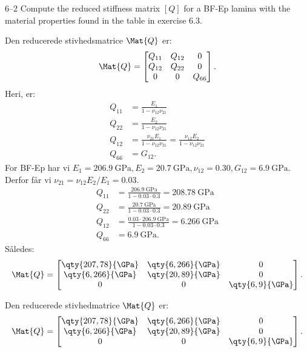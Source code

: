 \begin{problem}{6--2}
  Compute the reduced stiffness matrix $[Q]$ for a BF-Ep lamina with the material properties found in the table in exercise 6.3.
\end{problem}

\begin{derivation}
  Den reducerede stivhedsmatrice $\Mat{Q}$ er:
  \begin{equation*}
    \Mat{Q} = \begin{bmatrix}
      Q_{11} & Q_{12} & 0\\
    Q_{12} & Q_{22} & 0\\
    0 & 0 & Q_{66}\\
    \end{bmatrix}
  .\end{equation*}
  Heri, er:
  \begin{align*}
    Q_{11} &= \frac{E_1}{1 - \nu_{12}\nu_{21}} \\
    Q_{22} &= \frac{E_2}{1 - \nu_{12}\nu_{21}} \\
    Q_{12} &= \frac{\nu_{21} E_1}{ 1 - \nu_{12} \nu_{21}} = \frac{\nu_{12} E_2}{1  - \nu_{12} \nu_{21}} \\
    Q_{66} &= G_{12}
  .\end{align*}
  For BF-Ep har vi $E_1 = \qty{206,9}{\GPa}, E_2 = \qty{20,7}{\GPa}, \nu_{12} = \num{0,30}, G_{12} = \qty{6,9}{\GPa}$. Derfor får vi $\nu_{21} = \nu_{12} E_2 / E_1 = \num{0,03}$.
  \begin{align*}
    Q_{11} &= \frac{\qty{206,9}{\GPa}}{1 - \num{0,03} \cdot \num{0,3}}  = \qty{208.78}{\giga\pascal} \\
    Q_{22} &= \frac{\qty{20,7}{\GPa}}{1 - \num{0,03} \cdot \num{0,3} }  = \qty{20.89}{\giga\pascal}  \\
    Q_{12} &= \frac{\num{0,03} \cdot \qty{206,9}{\GPa}}{1 - \num{0,03} \cdot \num{0,3} }  = \qty{6.266}{\giga\pascal}    \\
    Q_{66} &= \qty{6,9}{\GPa} 
  .\end{align*}
  Således:
  \begin{equation*}
    \Mat{Q} = \begin{bmatrix}
      \qty{207,78}{\GPa} & \qty{6,266}{\GPa} & 0\\
    \qty{6,266}{\GPa} & \qty{20,89}{\GPa} & 0\\
    0 & 0 & \qty{6,9}{\GPa} \\
    \end{bmatrix}
  .\end{equation*}
\end{derivation}  

\begin{finalresult}
  Den reducerede stivhedmatrice $\Mat{Q}$ er:
  \begin{equation*}
    \Mat{Q} = \begin{bmatrix}
      \qty{207,78}{\GPa} & \qty{6,266}{\GPa} & 0\\
    \qty{6,266}{\GPa} & \qty{20,89}{\GPa} & 0\\
    0 & 0 & \qty{6,9}{\GPa} \\
    \end{bmatrix}
  .\end{equation*}
\end{finalresult}

